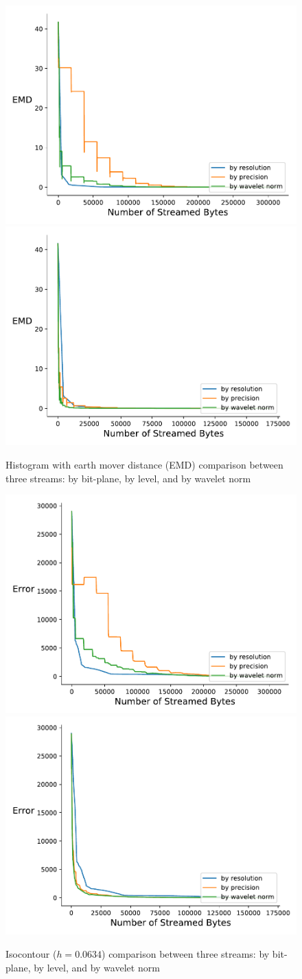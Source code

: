 \begin{figure}[htb!]
	\centering
	{\includegraphics[width=0.4\linewidth]{img/independent/normalized/histogram-miranda-viscosity}}
	{\includegraphics[width=0.4\linewidth]{img/skip-zeros/histogram-miranda-viscosity}}
	\caption {Histogram with earth mover distance (EMD) comparison between three streams: by bit-plane, by level, and by wavelet norm}
	\label{fig:histogram_traditional_vs_by_norm_viscosity}
\end{figure}

\begin{figure}[htb!]
	\centering
	{\includegraphics[width=0.4\linewidth]{img/independent/normalized/isocontour-miranda-viscosity}}
	{\includegraphics[width=0.4\linewidth]{img/skip-zeros/isocontour-miranda-viscosity}}
	\caption {Isocontour ($h = 0.0634$) comparison between three streams: by bit-plane, by level, and by wavelet norm}
	\label{fig:isocontour_traditional_vs_by_norm_viscosity}
\end{figure}

